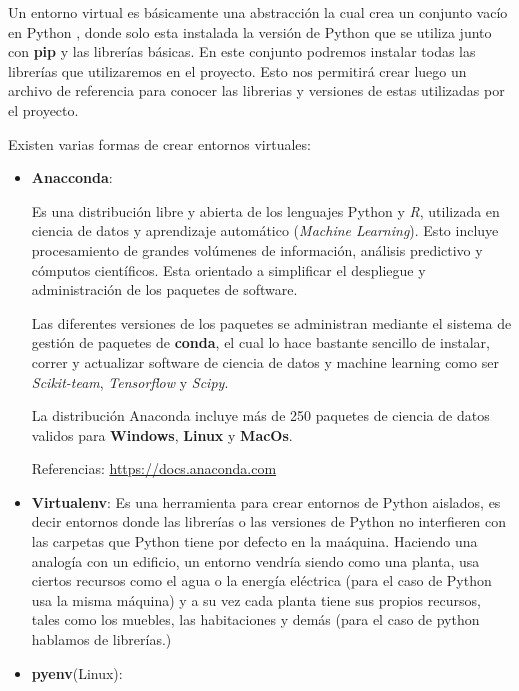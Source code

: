 \documentclass[10pt]{article}
\newcommand{\py}[1]{{\textcolor{B}{Python} #1}}
\begin{document}
Un entorno virtual es básicamente una abstracción la cual crea un conjunto vacío en \py{}, donde solo esta instalada la versión de \py{} que se utiliza junto con \textbf{pip} y las librerías básicas. En este conjunto podremos instalar todas las librerías que utilizaremos en el proyecto. Esto nos permitirá crear luego un archivo de referencia para conocer las librerias y versiones de estas utilizadas por el proyecto. 

Existen varias formas de crear entornos virtuales: 
\begin{itemize}
\item \textbf{Anacconda}: 

	Es una distribución libre y abierta de los lenguajes \py	 y \textit{R}, utilizada en ciencia de datos y aprendizaje automático (\textit{Machine Learning}).
Esto incluye procesamiento de grandes volúmenes de información, análisis predictivo y cómputos científicos. Esta orientado a simplificar el despliegue y administración de los paquetes de software.

Las diferentes versiones de los paquetes se administran mediante el sistema de gestión de paquetes de \textbf{conda}, el cual lo hace bastante sencillo de instalar, correr y actualizar software de ciencia de datos y machine learning como ser \textit{Scikit-team}, \textit{Tensorflow} y \textit{Scipy}.

La distribución Anaconda incluye más de 250 paquetes de ciencia de datos validos para \textbf{Windows}, \textbf{Linux} y \textbf{MacOs}.

\textcolor{R}{Referencias:} \url{https://docs.anaconda.com}

\item \textbf{Virtualenv}:
 Es una herramienta para crear entornos de \py aislados, es decir entornos donde las librerías o las versiones de \py no interfieren con las carpetas que \py tiene por defecto en la maáquina. Haciendo una analogía con un edificio, un entorno vendría siendo como una planta, usa ciertos recursos como el agua o la energía eléctrica (para el caso de \py usa la misma máquina) y a su vez cada planta tiene sus propios recursos, tales como los muebles, las habitaciones y demás (para el caso de python hablamos de librerías.)

\item \textbf{pyenv}(Linux):
\end{itemize} 
\end{document}
